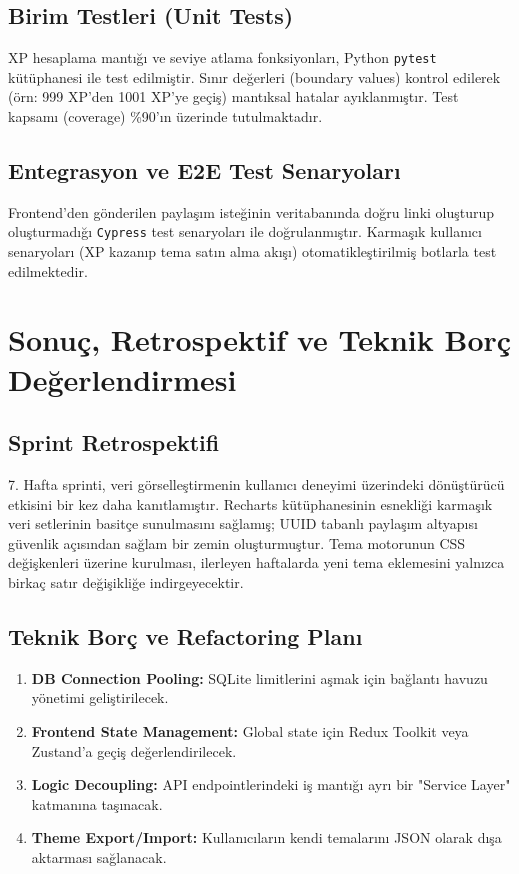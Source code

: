 \documentclass[12pt,a4paper]{article}
\begin{document}
\subsection{Birim Testleri (Unit Tests)}
XP hesaplama mantığı ve seviye atlama fonksiyonları, Python \texttt{pytest} kütüphanesi ile test edilmiştir. Sınır değerleri (boundary values) kontrol edilerek (örn: 999 XP'den 1001 XP'ye geçiş) mantıksal hatalar ayıklanmıştır. Test kapsamı (coverage) \%90'ın üzerinde tutulmaktadır.

\subsection{Entegrasyon ve E2E Test Senaryoları}
Frontend'den gönderilen paylaşım isteğinin veritabanında doğru linki oluşturup oluşturmadığı \texttt{Cypress} test senaryoları ile doğrulanmıştır. Karmaşık kullanıcı senaryoları (XP kazanıp tema satın alma akışı) otomatikleştirilmiş botlarla test edilmektedir.

\section{Sonuç, Retrospektif ve Teknik Borç Değerlendirmesi}

\subsection{Sprint Retrospektifi}
7. Hafta sprinti, veri görselleştirmenin kullanıcı deneyimi üzerindeki dönüştürücü etkisini bir kez daha kanıtlamıştır. Recharts kütüphanesinin esnekliği karmaşık veri setlerinin basitçe sunulmasını sağlamış; UUID tabanlı paylaşım altyapısı güvenlik açısından sağlam bir zemin oluşturmuştur. Tema motorunun CSS değişkenleri üzerine kurulması, ilerleyen haftalarda yeni tema eklemesini yalnızca birkaç satır değişikliğe indirgeyecektir.

\subsection{Teknik Borç ve Refactoring Planı}
\begin{enumerate}
    \item \textbf{DB Connection Pooling:} SQLite limitlerini aşmak için bağlantı havuzu yönetimi geliştirilecek.
    \item \textbf{Frontend State Management:} Global state için Redux Toolkit veya Zustand'a geçiş değerlendirilecek.
    \item \textbf{Logic Decoupling:} API endpointlerindeki iş mantığı ayrı bir "Service Layer" katmanına taşınacak.
    \item \textbf{Theme Export/Import:} Kullanıcıların kendi temalarını JSON olarak dışa aktarması sağlanacak.
\end{enumerate}
\end{document}
